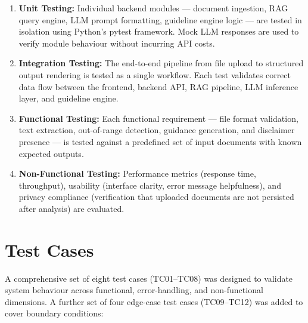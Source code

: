 \documentclass[12pt,a4paper]{report}
\begin{document}
\begin{enumerate}
    \item \textbf{Unit Testing:} Individual backend modules --- document ingestion, RAG query engine, LLM prompt formatting, guideline engine logic --- are tested in isolation using Python's pytest framework. Mock LLM responses are used to verify module behaviour without incurring API costs.
    \item \textbf{Integration Testing:} The end-to-end pipeline from file upload to structured output rendering is tested as a single workflow. Each test validates correct data flow between the frontend, backend API, RAG pipeline, LLM inference layer, and guideline engine.
    \item \textbf{Functional Testing:} Each functional requirement --- file format validation, text extraction, out-of-range detection, guidance generation, and disclaimer presence --- is tested against a predefined set of input documents with known expected outputs.
    \item \textbf{Non-Functional Testing:} Performance metrics (response time, throughput), usability (interface clarity, error message helpfulness), and privacy compliance (verification that uploaded documents are not persisted after analysis) are evaluated.
\end{enumerate}

\section{Test Cases}
A comprehensive set of eight test cases (TC01--TC08) was designed to validate system behaviour across functional, error-handling, and non-functional dimensions. A further set of four edge-case test cases (TC09--TC12) was added to cover boundary conditions:
\end{document}

